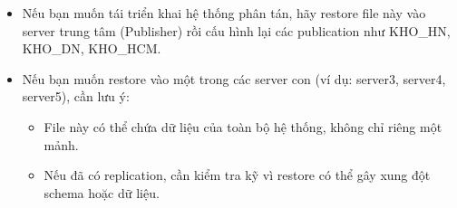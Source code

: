\documentclass[a4paper,12pt]{report}
\begin{document}
\begin{enumerate}[label=B\arabic*:]
    \begin{itemize}
        \item Nếu bạn muốn tái triển khai hệ thống phân tán, hãy restore file này vào server trung tâm (Publisher) rồi cấu hình lại các publication như KHO\_HN, KHO\_DN, KHO\_HCM.
        \item Nếu bạn muốn restore vào một trong các server con (ví dụ: server3, server4, server5), cần lưu ý:
        \begin{itemize}
            \item File này có thể chứa dữ liệu của toàn bộ hệ thống, không chỉ riêng một mảnh.
            \item Nếu đã có replication, cần kiểm tra kỹ vì restore có thể gây xung đột schema hoặc dữ liệu.
        \end{itemize}
    \end{itemize}
\end{enumerate}
\end{document}
